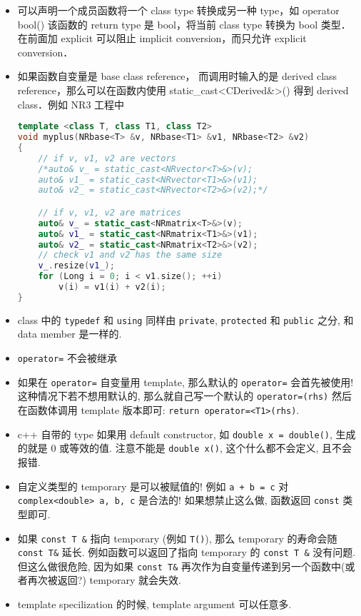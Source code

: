 \begin{itemize}
\item 可以声明一个成员函数将一个 class type 转换成另一种 type，如 operator bool() {} 该函数的 return type 是 bool，将当前 class type 转换为 bool 类型．在前面加 explicit 可以阻止 implicit conversion，而只允许 explicit conversion．
\item 如果函数自变量是 base class reference， 而调用时输入的是 derived class reference，那么可以在函数内使用 static_cast<CDerived&>() 得到 derived class．例如 NR3 工程中
\begin{lstlisting}[language=cpp]
template <class T, class T1, class T2>
void myplus(NRbase<T> &v, NRbase<T1> &v1, NRbase<T2> &v2)
{
	// if v, v1, v2 are vectors
	/*auto& v_ = static_cast<NRvector<T>&>(v);
	auto& v1_ = static_cast<NRvector<T1>&>(v1);
	auto& v2_ = static_cast<NRvector<T2>&>(v2);*/

	// if v, v1, v2 are matrices
	auto& v_ = static_cast<NRmatrix<T>&>(v);
	auto& v1_ = static_cast<NRmatrix<T1>&>(v1);
	auto& v2_ = static_cast<NRmatrix<T2>&>(v2);
	// check v1 and v2 has the same size
	v_.resize(v1_);
	for (Long i = 0; i < v1.size(); ++i)
		v(i) = v1(i) + v2(i);
}
\end{lstlisting}

\item class 中的 \verb`typedef` 和 \verb`using` 同样由 \verb`private`, \verb`protected` 和 \verb`public` 之分, 和 data member 是一样的.
\item \verb`operator=` 不会被继承
\item 如果在 \verb`operator=` 自变量用 template, 那么默认的 \verb`operator=` 会首先被使用! 这种情况下若不想用默认的, 那么就自己写一个默认的 \verb`operator=(rhs)` 然后在函数体调用 template 版本即可: \verb`return operator=<T1>(rhs)`.
\item c++ 自带的 type 如果用 default constructor, 如 \verb`double x = double()`, 生成的就是 0 或等效的值. 注意不能是 \verb`double x()`, 这个什么都不会定义, 且不会报错.
\item 自定义类型的 temporary 是可以被赋值的! 例如 \verb`a + b = c` 对 \verb`complex<double> a, b, c` 是合法的! 如果想禁止这么做, 函数返回 \verb`const` 类型即可.
\item 如果 \verb`const T &` 指向 temporary (例如 \verb`T()`), 那么 temporary 的寿命会随 \verb`const T&` 延长. 例如函数可以返回了指向 temporary 的 \verb`const T &` 没有问题. 但这么做很危险, 因为如果 \verb`const T&` 再次作为自变量传递到另一个函数中(或者再次被返回?) temporary 就会失效.
\item template specilization 的时候, template argument 可以任意多.
\end{itemize}
